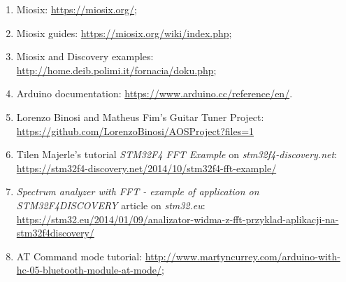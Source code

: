 \begin{enumerate}
	\item Miosix: \href{https://miosix.org/}{https://miosix.org/};
	\item Miosix guides: \href{https://miosix.org/wiki/index.php}{https://miosix.org/wiki/index.php};
	\item Miosix and Discovery examples: \href{http://home.deib.polimi.it/fornacia/doku.php}{http://home.deib.polimi.it/fornacia/doku.php};
	\item Arduino documentation: \href{https://www.arduino.cc/reference/en/}{https://www.arduino.cc/reference/en/}.
	\item Lorenzo Binosi and Matheus Fim's Guitar Tuner Project: \\
	\href{https://github.com/LorenzoBinosi/AOSProject?files=1}{https://github.com/LorenzoBinosi/AOSProject?files=1}
	\item Tilen Majerle's tutorial \textit{STM32F4 FFT Example} on \textit{stm32f4-discovery.net}: \\
	\href{https://stm32f4-discovery.net/2014/10/stm32f4-fft-example/}{https://stm32f4-discovery.net/2014/10/stm32f4-fft-example/}
	\item \textit{Spectrum analyzer with FFT - example of application on STM32F4DISCOVERY} article on \textit{stm32.eu}:
	\href{https://stm32.eu/2014/01/09/analizator-widma-z-fft-przyklad-aplikacji-na-stm32f4discovery/}{https://stm32.eu/2014/01/09/analizator-widma-z-fft-przyklad-aplikacji-na-stm32f4discovery/}
	\item AT Command mode tutorial: \href{http://www.martyncurrey.com/arduino-with-hc-05-bluetooth-module-at-mode/}{http://www.martyncurrey.com/arduino-with-hc-05-bluetooth-module-at-mode/};
\end{enumerate}